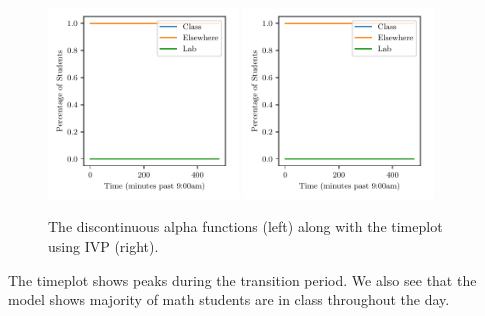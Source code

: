 \documentclass[11pt]{amsart}
\begin{document}
\begin{figure}[htp]
    \centering
    \includegraphics[width=0.45\textwidth]{temp.pdf}\hfill
    \includegraphics[width=0.45\textwidth]{temp.pdf}\hfill

    \caption{The discontinuous alpha functions (left) along with the timeplot using IVP (right).}
    \label{fig:discontinuous_alpha}

\end{figure}

The timeplot shows peaks during the transition period. We also see that the model shows majority of math students are in class throughout the day.
\end{document}
